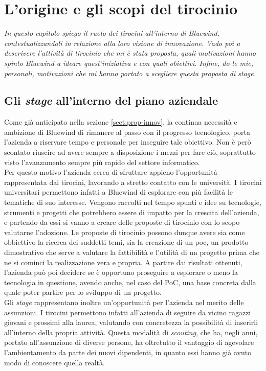 \chapter{L'origine e gli scopi del tirocinio}
\label{chap:descrizione-tirocinio}
\noindent
\textit{In questo capitolo spiego il ruolo dei tirocini all'interno di Bluewind, contestualizzandoli in relazione alla loro visione di innovazione.
Vado poi a descrivere l'attività di tirocinio che mi è stata proposta, quali motivazioni hanno spinto Bluewind a ideare quest'iniziativa e con quali obiettivi.
Infine, do le mie, personali, motivazioni che mi hanno portato a scegliere questa proposta di stage.}

\section{Gli \textit{stage} all'interno del piano aziendale}
\noindent
Come già anticipato nella sezione \ref{sect:prop-innov}, la continua necessità e ambizione di Bluewind di rimanere al passo con il progresso tecnologico, porta l'azienda a riservare tempo e personale per inseguire tale obiettivo.
Non è però scontato riuscire ad avere sempre a disposizione i mezzi per fare ciò, soprattutto visto l'avanzamento sempre più rapido del settore informatico.\\

\noindent
Per questo motivo l'azienda cerca di sfruttare appieno l'opportunità rappresentata dai tirocini, lavorando a stretto contatto con le università.
I tirocini universitari permettono infatti a Bluewind di esplorare con più facilità le tematiche di suo interesse.
Vengono raccolti nel tempo spunti e idee su tecnologie, strumenti e progetti che potrebbero essere di impatto per la crescita dell'azienda, e partendo da essi si vanno a creare delle proposte di tirocinio con lo scopo valutarne l'adozione.
Le proposte di tirocinio possono dunque avere sia come obbiettivo la ricerca dei suddetti temi, sia la creazione di un \gls{poc}, un prodotto dimostrativo che serve a valutare la fattibilità e l'utilità di un progetto prima che ne si cominci la realizzazione vera e propria.
A partire dai risultati ottenuti, l'azienda può poi decidere se è opportuno proseguire a esplorare o meno la tecnologia in questione, avendo anche, nel caso del PoC, una base concreta dalla quale poter partire per lo sviluppo di un progetto.\\

\noindent
Gli \textit{stage} rappresentano inoltre un'opportunità per l'azienda nel merito delle assunzioni.
I tirocini permettono infatti all'azienda di seguire da vicino ragazzi giovani e prossimi alla laurea, valutando con concretezza la possibilità di inserirli all'interno della propria attività.
Questa modalità di \textit{scouting}, che ha, negli anni, portato all'assunzione di diverse persone, ha oltretutto il vantaggio di agevolare l'ambientamento da parte dei nuovi dipendenti, in quanto essi hanno già avuto modo di conoscere quella realtà.

